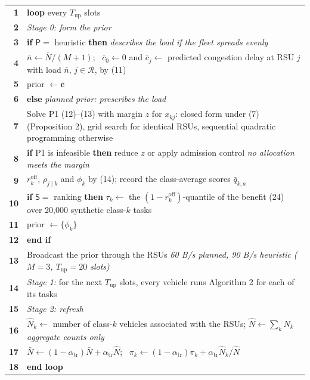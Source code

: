 \documentclass[10pt]{article}
\newcommand{\lnum}[1]{\textbf{#1}}
\newcommand{\cmt}[1]{\hfill{\itshape\footnotesize #1}}
\begin{document}
\vspace{4pt}
\small
\begin{tabularx}{\textwidth}{N Y}
\lnum{1} & \textbf{loop} every $T_{\mathrm{up}}$ slots \\
\lnum{2} & \quad \textit{Stage 0: form the prior} \\
\lnum{3} & \quad \textbf{if} $\mathsf P=$ heuristic \textbf{then} \cmt{describes the load if the fleet spreads evenly} \\
\lnum{4} & \quad\quad $\bar n\gets\bar N/(M+1)$; \ $\bar c_0\gets0$ and $\bar c_j\gets$ predicted congestion delay at RSU $j$ with load $\bar n$, $j\in\mathcal R$, by (11) \\
\lnum{5} & \quad\quad prior $\gets\bar{\mathbf c}$ \\
\lnum{6} & \quad \textbf{else} \cmt{planned prior: prescribes the load} \\
\lnum{7} & \quad\quad Solve P1 (12)--(13) with margin $z$ for $x_{kj}$: closed form under (7) (Proposition 2), grid search for identical RSUs, sequential quadratic programming otherwise \\
\lnum{8} & \quad\quad \textbf{if} P1 is infeasible \textbf{then} reduce $z$ or apply admission control \cmt{no allocation meets the margin} \\
\lnum{9} & \quad\quad $r^{\mathrm{off}}_k$, $\rho_{j\mid k}$ and $\phi_k$ by (14); record the class-average scores $\bar q_{k,a}$ \\
\lnum{10} & \quad\quad \textbf{if} $\mathsf S=$ ranking \textbf{then} $\tau_k\gets$ the $(1-r^{\mathrm{off}}_k)$-quantile of the benefit (24) over 20{,}000 synthetic class-$k$ tasks \\
\lnum{11} & \quad\quad prior $\gets\{\phi_k\}$ \\
\lnum{12} & \quad \textbf{end if} \\
\lnum{13} & \quad Broadcast the prior through the RSUs \cmt{60 B/s planned, 90 B/s heuristic ($M=3$, $T_{\mathrm{up}}=20$ slots)} \\
\lnum{14} & \quad \textit{Stage 1:} for the next $T_{\mathrm{up}}$ slots, every vehicle runs Algorithm 2 for each of its tasks \\
\lnum{15} & \quad \textit{Stage 2: refresh} \\
\lnum{16} & \quad $\hat N_k\gets$ number of class-$k$ vehicles associated with the RSUs; $\hat N\gets\sum_k\hat N_k$ \cmt{aggregate counts only} \\
\lnum{17} & \quad $\bar N\gets(1-\alpha_{\mathrm{tr}})\bar N+\alpha_{\mathrm{tr}}\hat N$; \ $\pi_k\gets(1-\alpha_{\mathrm{tr}})\pi_k+\alpha_{\mathrm{tr}}\hat N_k/\hat N$ \\
\lnum{18} & \textbf{end loop} \\
\end{tabularx}
\end{document}

